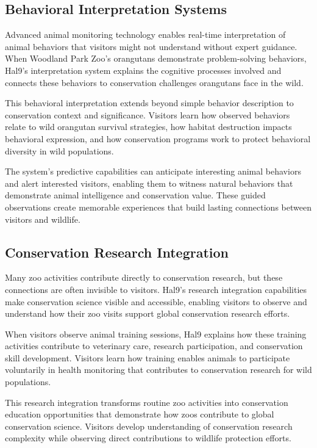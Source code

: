 \documentclass[
  Letterpaper,
]{scrbook}
\begin{document}
\subsection{Behavioral Interpretation
Systems}\label{behavioral-interpretation-systems}

Advanced animal monitoring technology enables real-time interpretation
of animal behaviors that visitors might not understand without expert
guidance. When Woodland Park Zoo's orangutans demonstrate
problem-solving behaviors, Hal9's interpretation system explains the
cognitive processes involved and connects these behaviors to
conservation challenges orangutans face in the wild.

This behavioral interpretation extends beyond simple behavior
description to conservation context and significance. Visitors learn how
observed behaviors relate to wild orangutan survival strategies, how
habitat destruction impacts behavioral expression, and how conservation
programs work to protect behavioral diversity in wild populations.

The system's predictive capabilities can anticipate interesting animal
behaviors and alert interested visitors, enabling them to witness
natural behaviors that demonstrate animal intelligence and conservation
value. These guided observations create memorable experiences that build
lasting connections between visitors and wildlife.

\subsection{Conservation Research
Integration}\label{conservation-research-integration}

Many zoo activities contribute directly to conservation research, but
these connections are often invisible to visitors. Hal9's research
integration capabilities make conservation science visible and
accessible, enabling visitors to observe and understand how their zoo
visits support global conservation research efforts.

When visitors observe animal training sessions, Hal9 explains how these
training activities contribute to veterinary care, research
participation, and conservation skill development. Visitors learn how
training enables animals to participate voluntarily in health monitoring
that contributes to conservation research for wild populations.

This research integration transforms routine zoo activities into
conservation education opportunities that demonstrate how zoos
contribute to global conservation science. Visitors develop
understanding of conservation research complexity while observing direct
contributions to wildlife protection efforts.
\end{document}
